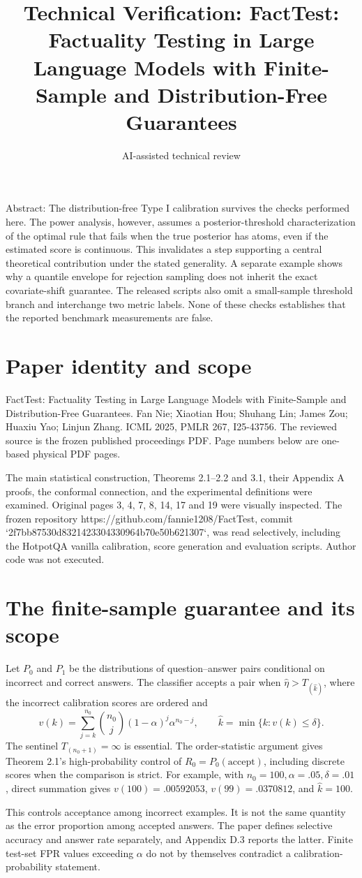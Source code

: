 \documentclass[10pt]{article}
\title{Technical Verification: FactTest: Factuality Testing in Large Language Models with Finite-Sample and Distribution-Free Guarantees}
\author{AI-assisted technical review}
\date{}
\begin{document}
\maketitle
Abstract: The distribution-free Type I calibration survives the checks performed here. The power analysis, however, assumes a posterior-threshold characterization of the optimal rule that fails when the true posterior has atoms, even if the estimated score is continuous. This invalidates a step supporting a central theoretical contribution under the stated generality. A separate example shows why a quantile envelope for rejection sampling does not inherit the exact covariate-shift guarantee. The released scripts also omit a small-sample threshold branch and interchange two metric labels. None of these checks establishes that the reported benchmark measurements are false.\par
\section*{Paper identity and scope}
FactTest: Factuality Testing in Large Language Models with Finite-Sample and Distribution-Free Guarantees. Fan Nie; Xiaotian Hou; Shuhang Lin; James Zou; Huaxiu Yao; Linjun Zhang. ICML 2025, PMLR 267, I25-43756. The reviewed source is the frozen published proceedings PDF. Page numbers below are one-based physical PDF pages.\par
The main statistical construction, Theorems 2.1–2.2 and 3.1, their Appendix A proofs, the conformal connection, and the experimental definitions were examined. Original pages 3, 4, 7, 8, 14, 17 and 19 were visually inspected. The frozen repository https://github.com/fannie1208/FactTest, commit `2f7bb87530d8321423304330964b70e50b621307`, was read selectively, including the HotpotQA vanilla calibration, score generation and evaluation scripts. Author code was not executed.\par
\section*{The finite-sample guarantee and its scope}
Let \(P_0\) and \(P_1\) be the distributions of question–answer pairs conditional on incorrect and correct answers. The classifier accepts a pair when \(\widehat\eta>T_{(\widehat k)}\), where the incorrect calibration scores are ordered and \[v(k)=\sum_{j=k}^{n_0}{n_0\choose j}(1-\alpha)^j\alpha^{n_0-j},
 \qquad \widehat k=\min\{k:v(k)\le\delta\}.\] The sentinel \(T_{(n_0+1)}=\infty\) is essential. The order-statistic argument gives Theorem 2.1’s high-probability control of \(R_0=P_0(\text{accept})\), including discrete scores when the comparison is strict. For example, with \(n_0=100,\alpha=.05,\delta=.01\), direct summation gives \(v(100)=.00592053\), \(v(99)=.0370812\), and \(\widehat k=100\).\par
This controls acceptance among incorrect examples. It is not the same quantity as the error proportion among accepted answers. The paper defines selective accuracy and answer rate separately, and Appendix D.3 reports the latter. Finite test-set FPR values exceeding \(\alpha\) do not by themselves contradict a calibration-probability statement.\par
\end{document}
